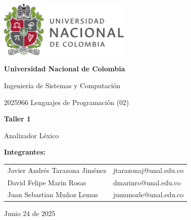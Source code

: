 \documentclass{article}
\begin{document}
\begin{titlepage}
  \centering
  \includegraphics[width=0.48\textwidth]{logo_universidad.png}
  \par\vspace{2cm}

  {\Large \textbf{Universidad Nacional de Colombia} \par}
  \vspace{0.5cm}
  {\large Ingeniería de Sistemas y Computación \par}
  {\large 2025966 Lenguajes de Programación (02)\par}
  \vspace{3cm}

  {\large \textbf{Taller 1} \par}
  {\large Analizador Léxico\par}
  \vspace{3cm}

  {\large \textbf{Integrantes:} \par}
  \vspace{0.5cm}
  \begin{tabular}{ll}
    Javier Andrés Tarazona Jiménez & jtarazonaj@unal.edu.co \\
    David Felipe Marin Rosas       & dmarinro@unal.edu.co   \\
    Juan Sebastian Muñoz Lemus     & jumunozle@unal.edu.co          \\
  \end{tabular}
  \par\vspace{3cm}

  {\large Junio 24 de 2025 \par}
\end{titlepage}

\tableofcontents %

\newpage %

\end{document}
